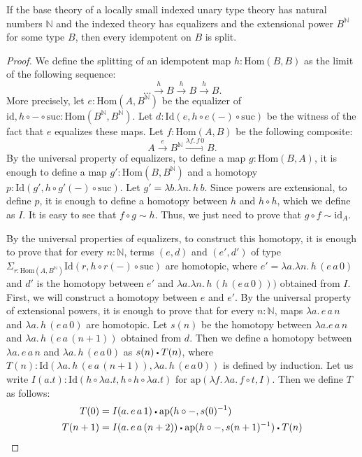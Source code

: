 \documentclass[reqno]{amsart}
\theoremstyle{definition}
\theoremstyle{remark}
\newcommand{\fs}[1]{\mathrm{#1}}
\newcommand{\Hom}{\fs{Hom}}
\newcommand{\Id}{\fs{Id}}
\newcommand{\sym}[1]{#1^{-1}}
\newcommand{\id}{\fs{id}}
\newcommand{\pmap}{\fs{ap}}
\numberwithin{figure}{section}
\newcommand{\ct}{%
  \mathchoice{\mathbin{\raisebox{0.25ex}{$\displaystyle\centerdot$}}}%
             {\mathbin{\raisebox{0.25ex}{$\centerdot$}}}%
             {\mathbin{\raisebox{0.25ex}{$\scriptstyle\,\centerdot\,$}}}%
             {\mathbin{\raisebox{0.25ex}{$\scriptscriptstyle\,\centerdot\,$}}}
}
\begin{document}
\begin{prop}
If the base theory of a locally small indexed unary type theory has natural numbers $\mathbb{N}$ and the indexed theory has equalizers and the extensional power $B^\mathbb{N}$ for some type $B$, then every idempotent on $B$ is split.
\end{prop}
\begin{proof}
We define the splitting of an idempotent map $h : \Hom(B,B)$ as the limit of the following sequence:
\[ \ldots \xrightarrow{h} B \xrightarrow{h} B \xrightarrow{h} B. \]
More precisely, let $e : \Hom(A,B^\mathbb{N})$ be the equalizer of $\id, h \circ - \circ \mathrm{suc} : \Hom(B^\mathbb{N},B^\mathbb{N})$.
Let $d : \Id(e, h \circ e(-) \circ \mathrm{suc})$ be the witness of the fact that $e$ equalizes these maps.
Let $f : \Hom(A,B)$ be the following composite:
\[ A \xrightarrow{e} B^\mathbb{N} \xrightarrow{\lambda f.\,f\,0} B. \]
By the universal property of equalizers, to define a map $g : \Hom(B,A)$, it is enough to define a map $g' : \Hom(B,B^\mathbb{N})$ and a homotopy $p : \Id(g', h \circ g'(-) \circ \mathrm{suc})$.
Let $g' = \lambda b. \lambda n.\,h\,b$.
Since powers are extensional, to define $p$, it is enough to define a homotopy between $h$ and $h \circ h$, which we define as $I$.
It is easy to see that $f \circ g \sim h$.
Thus, we just need to prove that $g \circ f \sim \id_A$.

By the universal properties of equalizers, to construct this homotopy, it is enough to prove that for every $n : \mathbb{N}$, terms $(e,d)$ and $(e',d')$ of type $\Sigma_{r : \Hom(A,B^\mathbb{N})} \Id(r, h \circ r(-) \circ \mathrm{suc})$ are homotopic,
where $e' = \lambda a. \lambda n.\,h\,(e\,a\,0)$ and $d'$ is the homotopy between $e'$ and $\lambda a. \lambda n.\,h\,(h\,(e\,a\,0)))$ obtained from $I$.
First, we will construct a homotopy between $e$ and $e'$.
By the universal property of extensional powers, it is enough to prove that for every $n : \mathbb{N}$, maps $\lambda a.\,e\,a\,n$ and $\lambda a.\,h\,(e\,a\,0)$ are homotopic.
Let $s(n)$ be the homotopy between $\lambda a.e\,a\,n$ and $\lambda a.\,h\,(e\,a\,(n+1))$ obtained from $d$.
Then we define a homotopy between $\lambda a.\,e\,a\,n$ and $\lambda a.\,h\,(e\,a\,0)$ as $s(n) \ct T(n)$, where $T(n) : \Id(\lambda a.\,h\,(e\,a\,(n+1)), \lambda a.\,h\,(e\,a\,0))$ is defined by induction.
Let us write $I(a.t) : \Id(h \circ \lambda a.t, h \circ h \circ \lambda a.t)$ for $\pmap(\lambda f.\,\lambda a.\,f \circ t, I)$.
Then we define $T$ as follows:
\begin{align*}
T(0) & = I(a.\,e\,a\,1) \ct \pmap(h \circ -, \sym{s(0)}) \\
T(n+1) & = I(a.\,e\,a\,(n+2)) \ct \pmap(h \circ -, \sym{s(n+1)}) \ct T(n)
\end{align*}


\end{proof}
\end{document}

